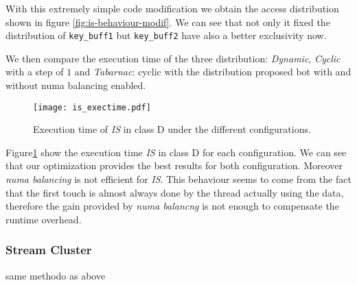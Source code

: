 With this extremely simple code modification we obtain the access distribution
shown in figure \ref{fig:is-behaviour-modif}. We can see that not only it fixed
the distribution of \texttt{key\_buff1} but \texttt{key\_buff2} have also a
better exclusivity now.

We then compare the execution time of the three distribution: \emph{Dynamic},
\emph{Cyclic} with a step of $1$ and \emph{Tabarnac}: cyclic with the
distribution proposed bot with and without numa balancing enabled.


\begin{figure}[htpb]
    \centering
    \texttt{[image: is\_exectime.pdf]}
    \caption{Execution time of \emph{IS} in class D under the different
configurations.}
\label{fig:is-res}
\end{figure}

Figure\ref{fig:is-res} show the execution time \emph{IS} in class D for each
configuration. We can see that our optimization provides the best results for
both configuration.  Moreover \emph{numa balancing} is not efficient for
\emph{IS}. This behaviour seems to come from the fact that the first touch is
almost always done by the thread actually using the data, therefore the gain
provided by \emph{numa balancng} is not enough to compensate the runtime
overhead.

\subsubsection{Stream Cluster}
same methodo as above

